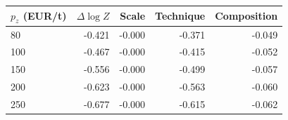 \begin{tabular}{lrrrr}
\toprule
$p_z$ (EUR/t) & $\Delta\log Z$ & Scale & Technique & Composition \\
\midrule
80 & -0.421 & -0.000 & -0.371 & -0.049 \\
100 & -0.467 & -0.000 & -0.415 & -0.052 \\
150 & -0.556 & -0.000 & -0.499 & -0.057 \\
200 & -0.623 & -0.000 & -0.563 & -0.060 \\
250 & -0.677 & -0.000 & -0.615 & -0.062 \\
\bottomrule
\end{tabular}
